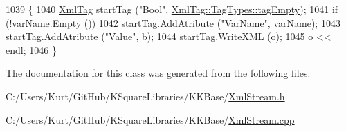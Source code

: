 \begin{DoxyCode}
1039 \{
1040   \hyperlink{class_k_k_b_1_1_xml_tag}{XmlTag} startTag (\textcolor{stringliteral}{"Bool"}, \hyperlink{class_k_k_b_1_1_xml_tag_a6c0ef0e23f982f49d55d4fb7eaff6ac9ac842083d30a90700e09f4cbf728f01b8}{XmlTag::TagTypes::tagEmpty});
1041   \textcolor{keywordflow}{if}  (!varName.\hyperlink{class_k_k_b_1_1_k_k_str_ac69942f73fffd672ec2a6e1c410afdb6}{Empty} ())
1042     startTag.AddAtribute (\textcolor{stringliteral}{"VarName"}, varName);
1043   startTag.AddAtribute (\textcolor{stringliteral}{"Value"}, b);
1044   startTag.WriteXML (o);
1045   o << \hyperlink{namespace_k_k_b_ad1f50f65af6adc8fa9e6f62d007818a8}{endl};
1046 \}
\end{DoxyCode}


The documentation for this class was generated from the following files\+:\begin{DoxyCompactItemize}
\item 
C\+:/\+Users/\+Kurt/\+Git\+Hub/\+K\+Square\+Libraries/\+K\+K\+Base/\hyperlink{_xml_stream_8h}{Xml\+Stream.\+h}\item 
C\+:/\+Users/\+Kurt/\+Git\+Hub/\+K\+Square\+Libraries/\+K\+K\+Base/\hyperlink{_xml_stream_8cpp}{Xml\+Stream.\+cpp}\end{DoxyCompactItemize}
